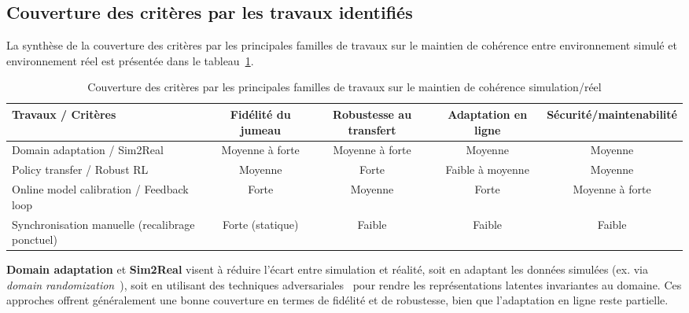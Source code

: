 \subsection*{Couverture des critères par les travaux identifiés}

La synthèse de la couverture des critères par les principales familles de travaux sur le maintien de cohérence entre environnement simulé et environnement réel est présentée dans le tableau~\ref{tab:couverture_criteres_travaux_trf}.

\begin{table}[h!]
  \centering
  \caption{Couverture des critères par les principales familles de travaux sur le maintien de cohérence simulation/réel}
  \label{tab:couverture_criteres_travaux_trf}
  \begin{tabular}{|p{5cm}|c|c|c|c|}
    \hline
    \textbf{Travaux / Critères}                                                       & \textbf{Fidélité du jumeau} & \textbf{Robustesse au transfert} & \textbf{Adaptation en ligne} & \textbf{Sécurité/maintenabilité} \\
    \hline
    Domain adaptation / Sim2Real~\cite{tobin2017domain,ganin2016domain}               & Moyenne à forte             & Moyenne à forte                  & Moyenne                      & Moyenne                          \\
    \hline
    Policy transfer / Robust RL~\cite{pinto2017robust}                                & Moyenne                     & Forte                            & Faible à moyenne             & Moyenne                          \\
    \hline
    Online model calibration / Feedback loop~\cite{deisenroth2011pilco}               & Forte                       & Moyenne                          & Forte                        & Moyenne à forte                  \\
    \hline
    Synchronisation manuelle (recalibrage ponctuel)~\cite{Standen2021,cyberbattlesim} & Forte (statique)            & Faible                           & Faible                       & Faible                           \\
    \hline
  \end{tabular}
\end{table}

\noindent
\textbf{Domain adaptation} et \textbf{Sim2Real} visent à réduire l’écart entre simulation et réalité, soit en adaptant les données simulées (ex. via \textit{domain randomization}~\cite{tobin2017domain}), soit en utilisant des techniques adversariales~\cite{ganin2016domain} pour rendre les représentations latentes invariantes au domaine. Ces approches offrent généralement une bonne couverture en termes de fidélité et de robustesse, bien que l’adaptation en ligne reste partielle.

